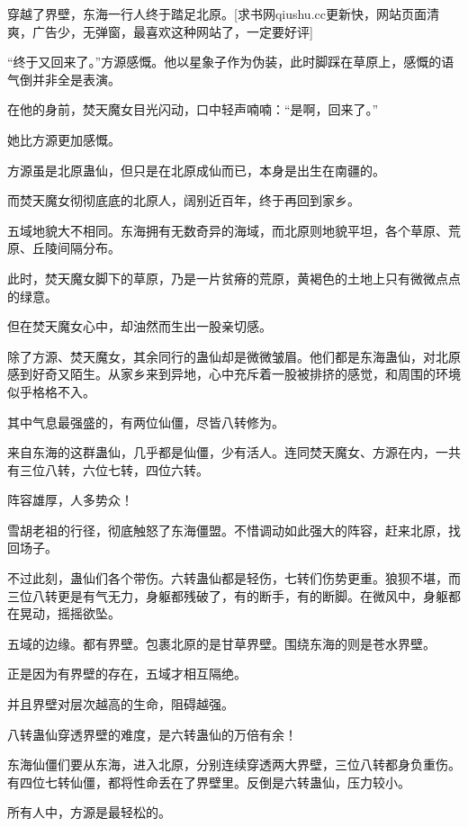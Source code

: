 
\begin{this_body}

穿越了界壁，东海一行人终于踏足北原。[求书网qiushu.cc更新快，网站页面清爽，广告少，无弹窗，最喜欢这种网站了，一定要好评]

“终于又回来了。”方源感慨。他以星象子作为伪装，此时脚踩在草原上，感慨的语气倒并非全是表演。

在他的身前，焚天魔女目光闪动，口中轻声喃喃：“是啊，回来了。”

她比方源更加感慨。

方源虽是北原蛊仙，但只是在北原成仙而已，本身是出生在南疆的。

而焚天魔女彻彻底底的北原人，阔别近百年，终于再回到家乡。

五域地貌大不相同。东海拥有无数奇异的海域，而北原则地貌平坦，各个草原、荒原、丘陵间隔分布。

此时，焚天魔女脚下的草原，乃是一片贫瘠的荒原，黄褐色的土地上只有微微点点的绿意。

但在焚天魔女心中，却油然而生出一股亲切感。

除了方源、焚天魔女，其余同行的蛊仙却是微微皱眉。他们都是东海蛊仙，对北原感到好奇又陌生。从家乡来到异地，心中充斥着一股被排挤的感觉，和周围的环境似乎格格不入。

其中气息最强盛的，有两位仙僵，尽皆八转修为。

来自东海的这群蛊仙，几乎都是仙僵，少有活人。连同焚天魔女、方源在内，一共有三位八转，六位七转，四位六转。

阵容雄厚，人多势众！

雪胡老祖的行径，彻底触怒了东海僵盟。不惜调动如此强大的阵容，赶来北原，找回场子。

不过此刻，蛊仙们各个带伤。六转蛊仙都是轻伤，七转们伤势更重。狼狈不堪，而三位八转更是有气无力，身躯都残破了，有的断手，有的断脚。在微风中，身躯都在晃动，摇摇欲坠。

五域的边缘。都有界壁。包裹北原的是甘草界壁。围绕东海的则是苍水界壁。

正是因为有界壁的存在，五域才相互隔绝。

并且界壁对层次越高的生命，阻碍越强。

八转蛊仙穿透界壁的难度，是六转蛊仙的万倍有余！

东海仙僵们要从东海，进入北原，分别连续穿透两大界壁，三位八转都身负重伤。有四位七转仙僵，都将性命丢在了界壁里。反倒是六转蛊仙，压力较小。

所有人中，方源是最轻松的。


\end{this_body}
